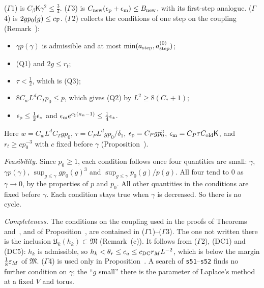 \begin{detail}
\begin{step}
($\Gamma$1) is $C_\beta\mathsf K\gamma^2\le\frac34$. ($\Gamma$3) is $C_{\rm new}(\epsilon_{\rm p}+\epsilon_{\rm m})\le B_{\rm new}$, with its first-step analogue. ($\Gamma$4) is $2gp_0(g)\le c_{\rm F}$. ($\Gamma$2) collects the conditions of one step on the coupling (Remark~):
\begin{itemize}
\item $\gamma p(\gamma)$ is admissible and at most $\min(a_{\rm step},a^{(0)}_{\rm step})$;
\item (Q1) and $2g\le r_t$;
\item $\tau<\frac12$, which is (Q3);
\item $8C_wL^dC_Tp_0\le p$, which gives (Q2) by $L^2\ge8(C_*+1)$;
\item $\epsilon_{\rm p}\le\frac12\epsilon_*$ and $\epsilon_{\rm m}e^{c_\natural(\kappa_n-1)}\le\frac14\epsilon_*$.
\end{itemize}
Here $w=C_wL^dC_Tgp_0$, $\tau=C_PL^dgp_0/\delta_1$, $\epsilon_{\rm p}=C_Pgp_0^3$, $\epsilon_{\rm m}=C_P\tau C_{\rm old}\mathsf K$, and $r_t\ge cp_0^{-3}$ with $c$ fixed before $\gamma$ (Proposition~).

\emph{Feasibility.} Since $p_0\ge1$, each condition follows once four quantities are small: $\gamma$, $\gamma p(\gamma)$, $\sup_{g\le\gamma}gp_0(g)^3$ and $\sup_{g\le\gamma}p_0(g)/p(g)$. All four tend to $0$ as $\gamma\to0$, by the properties of $p$ and $p_0$. All other quantities in the conditions are fixed before $\gamma$. Each condition stays true when $\gamma$ is decreased. So there is no cycle.

\emph{Completeness.} The conditions on the coupling used in the proofs of Theorems~ and~, and of Proposition~, are contained in ($\Gamma$1)--($\Gamma$3). The one not written there is the inclusion $\mathfrak U_k(h_k)\subset\mathfrak M$ (Remark~(c)). It follows from ($\Gamma$2), (DC1) and (DC5): $h_k$ is admissible, so $h_k<\theta_r\le c_a\le c_{\rm DC}r_ML^{-2}$, which is below the margin $\frac18\varepsilon_M$ of $\mathfrak M$. ($\Gamma$4) is used only in Proposition~. A search of \texttt{s51}--\texttt{s52} finds no further condition on $\gamma$; the ``$g$ small'' there is the parameter of Laplace's method at a fixed $V$ and torus.
\end{step}


\end{detail}
